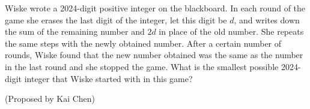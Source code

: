 Wiske wrote a 2024-digit positive integer on the blackboard. In each round of the game she erases the last digit of the integer, let this digit be $d$, and writes down the sum of the remaining number and $2d$ in place of the old number. She repeats the same steps with the newly obtained number. After a certain number of rounds, Wiske found that the new number obtained was the same as the number in the last round and she stopped the game. What is the smallest possible 2024-digit integer that Wiske started with in this game?

(Proposed by Kai Chen)